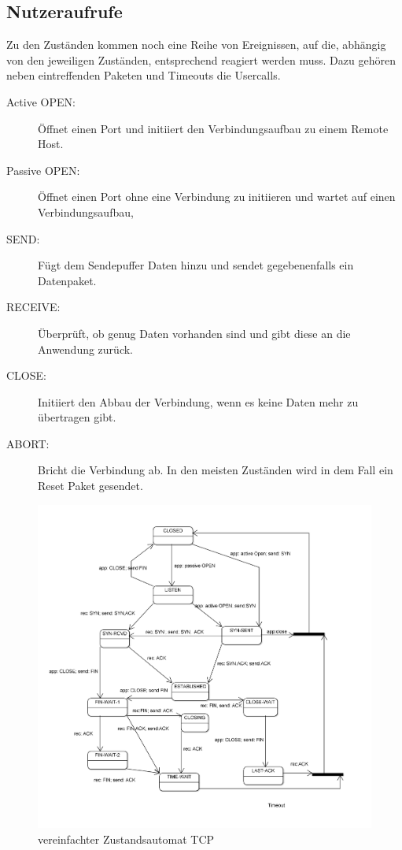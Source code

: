 \subsection{Nutzeraufrufe}
Zu den Zuständen kommen noch eine Reihe von Ereignissen, auf die, abhängig von den jeweiligen Zuständen, entsprechend reagiert werden muss. 
Dazu gehören neben eintreffenden Paketen und Timeouts die Usercalls.
\begin{description}
\item[Active OPEN: ]Öffnet einen Port und initiiert den Verbindungsaufbau zu einem Remote Host.
\item[Passive OPEN: ] Öffnet einen Port ohne eine Verbindung zu initiieren und wartet auf einen Verbindungsaufbau,
\item[SEND: ] Fügt dem Sendepuffer Daten hinzu und sendet gegebenenfalls ein Datenpaket.
\item[RECEIVE: ] Überprüft, ob genug Daten vorhanden sind und gibt diese an die Anwendung zurück.
\item[CLOSE: ] Initiiert den Abbau der Verbindung, wenn es keine Daten mehr zu  übertragen gibt.
\item[ABORT: ] Bricht die Verbindung ab. In den meisten Zuständen wird in dem Fall ein Reset Paket gesendet.
\end{description}

\begin{figure}[htp]
	\centering
	\includegraphics[width=1\textwidth]{Graphics/tcp_Statemachine.png}
	\caption{vereinfachter Zustandsautomat TCP}

\end{figure}
\FloatBarrier
